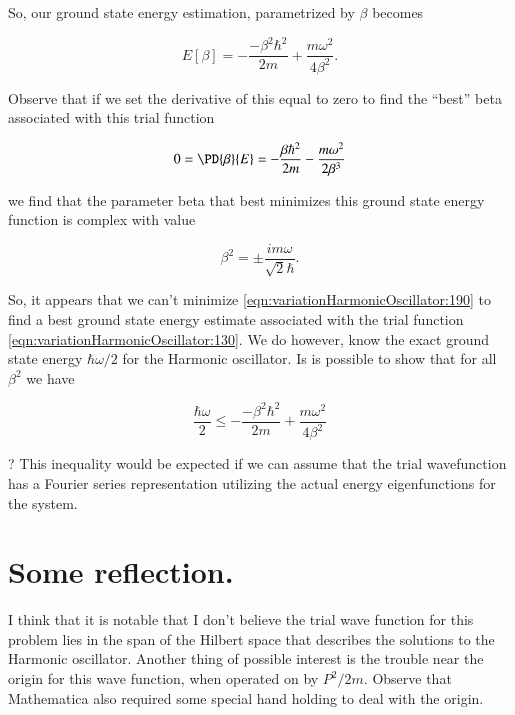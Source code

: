 So, our ground state energy estimation, parametrized by $\beta$ becomes

\begin{equation}\label{eqn:variationHarmonicOscillator:190}
E[\beta] = -\frac{- \beta^2 \hbar^2}{2m} + \frac{m \omega^2}{4 \beta^2}.
\end{equation}

Observe that if we set the derivative of this equal to zero to find the ``best'' beta associated with this trial function

\begin{equation}\label{eqn:variationHarmonicOscillator:210}
0 = \PD{\beta}{E} = -\frac{\beta \hbar^2}{2m} - \frac{m \omega^2}{2 \beta^3}
\end{equation}

we find that the parameter beta that best minimizes this ground state energy function is complex with value

\begin{equation}\label{eqn:variationHarmonicOscillator:230}
\beta^2 = \pm \frac{i m \omega}{\sqrt{2} \hbar}.
\end{equation}

So, it appears that we can't minimize \ref{eqn:variationHarmonicOscillator:190} to find a best ground state energy estimate associated with the trial function \ref{eqn:variationHarmonicOscillator:130}.  We do however, know the exact ground state energy $\hbar \omega/2$ for the Harmonic oscillator.  Is is possible to show that for all $\beta^2$ we have

\begin{equation}\label{eqn:variationHarmonicOscillator:250}
\frac{\hbar \omega}{2} \le -\frac{- \beta^2 \hbar^2}{2m} + \frac{m \omega^2}{4 \beta^2}
\end{equation}

?  This inequality would be expected if we can assume that the trial wavefunction has a Fourier series representation utilizing the actual energy eigenfunctions for the system.

\section{Some reflection.}

I think that it is notable that I don't believe the trial wave function for this problem lies in the span of the Hilbert space that describes the solutions to the Harmonic oscillator.  Another thing of possible interest is the trouble near the origin for this wave function, when operated on by $P^2/2m$.  Observe that Mathematica also required some special hand holding to deal with the origin.

